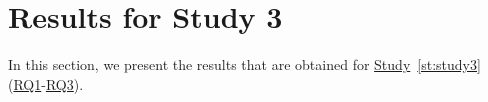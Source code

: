 \section{Results for Study 3} \label{ch5:study3}

In this section, we present the results that are obtained for
\hyperref[st:study3]{Study}~\ref{st:study3}
(\hyperref[ch5:rq1]{RQ1}-\hyperref[ch5:rq3]{RQ3}).
